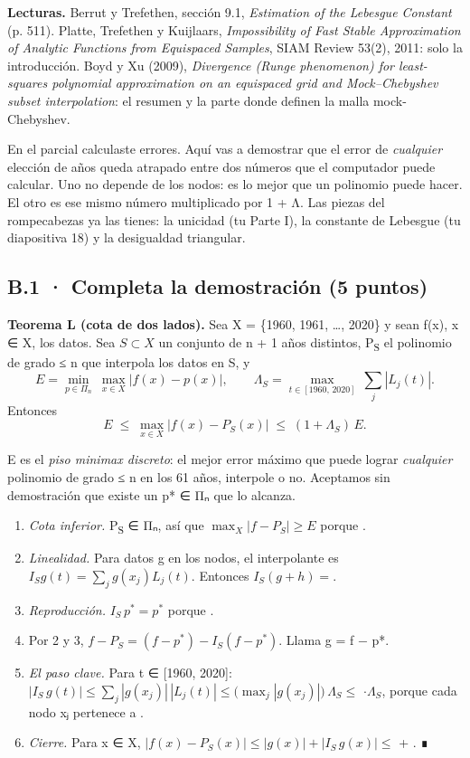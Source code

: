 \textbf{Lecturas.} Berrut y Trefethen, sección 9.1, \emph{Estimation of the Lebesgue Constant} (p. 511). Platte, Trefethen y Kuijlaars, \emph{Impossibility of Fast Stable Approximation of Analytic Functions from Equispaced Samples}, SIAM Review 53(2), 2011: solo la introducción. Boyd y Xu (2009), \emph{Divergence (Runge phenomenon) for least-squares polynomial approximation on an equispaced grid and Mock--Chebyshev subset interpolation}: el resumen y la parte donde definen la malla mock-Chebyshev.

En el parcial calculaste errores. Aquí vas a demostrar que el error de \emph{cualquier} elección de años queda atrapado entre dos números que el computador puede calcular. Uno no depende de los nodos: es lo mejor que un polinomio puede hacer. El otro es ese mismo número multiplicado por 1 + Λ. Las piezas del rompecabezas ya las tienes: la unicidad (tu Parte I), la constante de Lebesgue (tu diapositiva 18) y la desigualdad triangular.

\subsection{B.1 · Completa la demostración (5 puntos)}

\textbf{Teorema L (cota de dos lados).} Sea X = \{1960, 1961, \ldots, 2020\} y sean f(x), x ∈ X, los datos. Sea \(S \subset X\) un conjunto de n + 1 años distintos, P\textsubscript{S} el polinomio de grado ≤ n que interpola los datos en S, y
\[ E = \min_{p \in \Pi_n}\ \max_{x\in X} |f(x) - p(x)|, \qquad \Lambda_S = \max_{t\in[1960,\,2020]}\ \sum_{j} |L_j(t)|. \]
Entonces
\[ E \;\le\; \max_{x\in X} |f(x) - P_S(x)| \;\le\; (1 + \Lambda_S)\, E. \]

E es el \emph{piso minimax discreto}: el mejor error máximo que puede lograr \emph{cualquier} polinomio de grado ≤ n en los 61 años, interpole o no. Aceptamos sin demostración que existe un p* ∈ Πₙ que lo alcanza.

\begin{enumerate}
\def\labelenumi{\arabic{enumi}.}
\item \emph{Cota inferior.} P\textsubscript{S} ∈ Πₙ, así que \(\max_X|f - P_S| \ge E\) porque .
\item \emph{Linealidad.} Para datos g en los nodos, el interpolante es \(I_S g(t) = \sum_j g(x_j) L_j(t)\). Entonces \(I_S(g + h) = \).
\item \emph{Reproducción.} \(I_S\,p^* = p^*\) porque .
\item Por 2 y 3, \(f - P_S = (f - p^*) - I_S(f - p^*)\). Llama g = f − p*.
\item \emph{El paso clave.} Para t ∈ [1960, 2020]: \(|I_S\, g(t)| \le \sum_j |g(x_j)|\,|L_j(t)| \le \bigl(\max_j |g(x_j)|\bigr)\,\Lambda_S \le\) \(\cdot\Lambda_S\), porque cada nodo xⱼ pertenece a .
\item \emph{Cierre.} Para x ∈ X, \(|f(x) - P_S(x)| \le |g(x)| + |I_S\, g(x)| \le\)  + . ∎
\end{enumerate}

